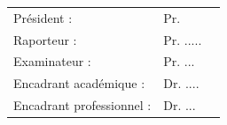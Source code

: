 \hspace{-0.8cm}
\begin{tabular}{l l l}
Président : & Pr.  & %
\\
Raporteur : &  Pr. .....\\
Examinateur : &  Pr. ... \\
Encadrant académique : & Dr. .... \\
Encadrant professionnel : & Dr. ... \\
                    
\end{tabular}


\setcounter{page}{1}

